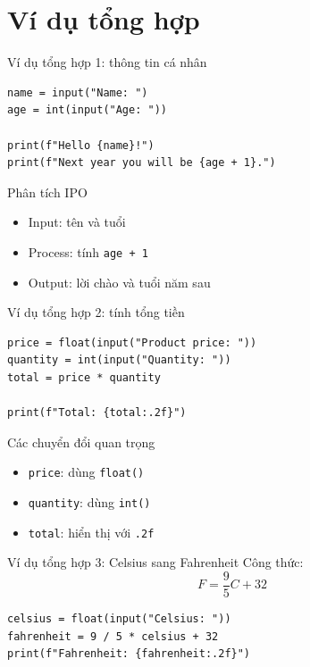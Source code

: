 \documentclass[aspectratio=169,10pt]{beamer}
\begin{document}
\section{Ví dụ tổng hợp}

\begin{frame}[fragile]{Ví dụ tổng hợp 1: thông tin cá nhân}
\begin{lstlisting}
name = input("Name: ")
age = int(input("Age: "))

print(f"Hello {name}!")
print(f"Next year you will be {age + 1}.")
\end{lstlisting}
\begin{block}{Phân tích IPO}
\begin{itemize}
  \item Input: tên và tuổi
  \item Process: tính \texttt{age + 1}
  \item Output: lời chào và tuổi năm sau
\end{itemize}
\end{block}
\end{frame}

\begin{frame}[fragile]{Ví dụ tổng hợp 2: tính tổng tiền}
\begin{lstlisting}
price = float(input("Product price: "))
quantity = int(input("Quantity: "))
total = price * quantity

print(f"Total: {total:.2f}")
\end{lstlisting}
\begin{block}{Các chuyển đổi quan trọng}
\begin{itemize}
  \item \texttt{price}: dùng \texttt{float()}
  \item \texttt{quantity}: dùng \texttt{int()}
  \item \texttt{total}: hiển thị với \texttt{.2f}
\end{itemize}
\end{block}
\end{frame}

\begin{frame}[fragile]{Ví dụ tổng hợp 3: Celsius sang Fahrenheit}
Công thức:
\[
F = \frac{9}{5}C + 32
\]
\begin{lstlisting}
celsius = float(input("Celsius: "))
fahrenheit = 9 / 5 * celsius + 32
print(f"Fahrenheit: {fahrenheit:.2f}")
\end{lstlisting}
\end{frame}
\end{document}
